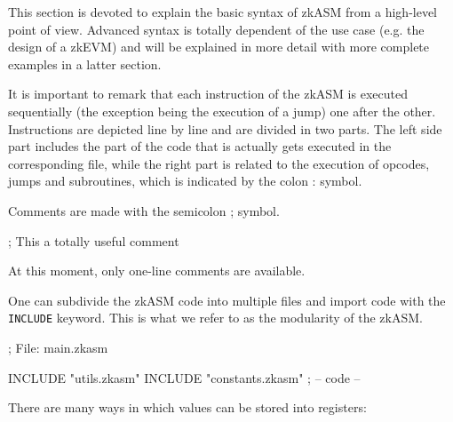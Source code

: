This section is devoted to explain the basic syntax of zkASM from a high-level point of view. Advanced syntax is totally dependent of the use case (e.g. the design of a zkEVM) and will be explained in more detail with more complete examples in a latter section.

It is important to remark that each instruction of the zkASM is executed sequentially (the exception being the execution of a jump) one after the other. Instructions are depicted line by line and are divided in two parts. The left side part includes the part of the code that is actually gets executed in the corresponding file, while the right part is related to the execution of opcodes, jumps and subroutines, which is indicated by the colon : symbol.

Comments are made with the semicolon ; symbol.

\begin{zkasm}
; This a totally useful comment
\end{zkasm}

At this moment, only one-line comments are available.

One can subdivide the zkASM code into multiple files and import code with the \texttt{INCLUDE} keyword. This is what we refer to as the modularity of the zkASM.

\begin{zkasm}
; File: main.zkasm

INCLUDE "utils.zkasm"
INCLUDE "constants.zkasm"
; -- code --
\end{zkasm}

There are many ways in which values can be stored into registers:

